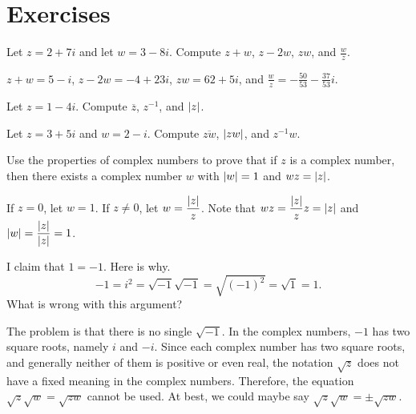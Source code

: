\section*{Exercises}


\begin{ex}
  Let $z=2+7i$ and let $w=3-8i$. Compute $z + w$, $z - 2w$, $zw$, and $\frac{w}{z}$.
  \begin{sol}
    $z + w = 5-i$, $z - 2w = -4 + 23i$, $zw = 62+5i$, and
    $\displaystyle\frac{w}{z} = -\frac{50}{53}-\frac{37}{53}i$.
  \end{sol}
\end{ex}

\begin{ex}
  Let $z = 1 - 4i$. Compute $\overline{z}$, $z^{-1}$, and $\left|z\right|$.
\end{ex}

\begin{ex}
  Let $z = 3+5i$ and $w = 2-i$. Compute $\overline{zw}$, $\left|zw\right|$,
  and $z^{-1}w$.
\end{ex}

\begin{ex}
  Use the properties of complex numbers to prove that if $z$ is a
  complex number, then there exists a complex number $w$ with
  $\left|w\right|=1$ and $wz=\left|z\right|$.
  \begin{sol}
    If $z=0$, let $w=1$. If $z\neq 0$, let
    $w =\displaystyle\frac{\left|z\right|}{z}$. Note that
    $\displaystyle wz = \frac{\left|z\right|}{z}z = \left|z\right|$ and
    $\displaystyle \left|w\right| = \frac{\left|z\right|}{\left|z\right|} = 1$.
  \end{sol}
\end{ex}

\begin{ex}
  I claim that $1=-1$. Here is why.
  \begin{equation*}
    -1=i^{2}=\sqrt{-1}\sqrt{-1}=\sqrt{(-1) ^{2}}=\sqrt{1}=1.
  \end{equation*}
  What is wrong with this argument?
  \begin{sol}
    The problem is that there is no single $\sqrt{-1}$. In the complex
    numbers, $-1$ has two square roots, namely $i$ and $-i$. Since
    each complex number has two square roots, and generally neither of
    them is positive or even real, the notation $\sqrt{z}$ does not
    have a fixed meaning in the complex numbers. Therefore, the
    equation $\sqrt{z}\sqrt{w} = \sqrt{zw}$ cannot be used. At best,
    we could maybe say $\sqrt{z}\sqrt{w} = \pm\sqrt{zw}$.
  \end{sol}
\end{ex}

